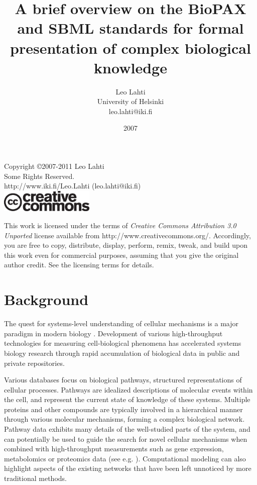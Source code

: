 \documentclass[a4paper,10pt,titlepage]{article}
\title{A brief overview on the BioPAX and SBML standards for formal
presentation of complex biological knowledge}
\author{Leo Lahti \\ University of Helsinki \\ leo.lahti@iki.fi}
\date{2007}
\begin{document}
\maketitle
\newpage

\noindent
Copyright \copyright 2007-2011 Leo Lahti\\
Some Rights Reserved.\\
http://www.iki.fi/Leo.Lahti (leo.lahti@iki.fi)\\[2mm]

\noindent
\includegraphics[width=4.5cm]{cclogo.eps}

\noindent This work is licensed under the terms of {\it Creative
	  Commons Attribution 3.0 Unported} license available from
	  http://www.creativecommons.org/. Accordingly, you are free
	  to copy, distribute, display, perform, remix, tweak, and
	  build upon this work even for commercial purposes, assuming
	  that you give the original author credit. See the licensing
	  terms for details.

	    	    
\newpage

\section{Background}

The quest for systems-level understanding of cellular mechanisms is a major para\-digm in modern biology \cite{Collins03}. Development of various high-throughput technologies for measuring cell-biological phenomena has accelerated systems biology research through rapid accumulation of biological data in public and private repositories.

Various databases focus on biological pathways, structured representations of cellular processes. Pathways are idealized descriptions of molecular events within the cell, and represent the current state of knowledge of these systems. Multiple proteins and other compounds are typically involved in a hierarchical manner through various molecular mechanisms, forming a complex biological network. Pathway data exhibits many details of the well-studied parts of the system, and can potentially be used to guide the search for novel cellular mechanisms when combined with high-throughput measurements such as gene expression, metabolomics or proteomics data (see e.g. \cite{Novak06}). Computational modeling can also highlight aspects of the existing networks that have been left unnoticed by more traditional methods.
\end{document}
